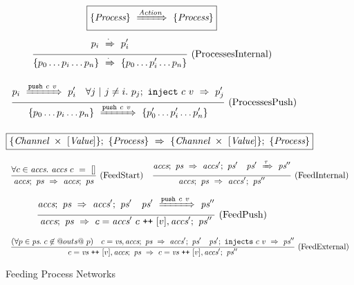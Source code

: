 
\begin{figure}

$$
  \boxed{\{ \textit{Process} \}~\xRightarrow{\textit{Action}}~\{ \textit{Process} \}}
$$
$$
\ruleIN{
  \ProcShake{p_i}{\cdot}{p'_i}
}{
  \ProcsShake{
    \sgl{p_0 \ldots p_i \ldots p_n}
  }{\cdot}{
    \sgl{p_0 \ldots p'_i \ldots p_n}
  }
}{ProcessesInternal}
$$

$$
\ruleIN{
  \ProcShake{p_i}{\Push~c~v}{p'_i}
  \quad
  \forall j~|~j \neq i.~
  \ProcInject{p_j}{c}{v}{p'_j}
}{
  \ProcsShake{
    \sgl{p_0 \ldots p_i \ldots p_n}
  }{\Push~c~v}{
    \sgl{p'_0 \ldots p'_i \ldots p'_n}
  }
}{ProcessesPush}
$$


\vspace{2em}
$$
  \boxed{
    \{\textit{Channel} ~\times~ [\textit{Value}]\};~\{ \textit{Process} \}~\Rightarrow~\{\textit{Channel} ~\times~ [\textit{Value}]\};~\{ \textit{Process} \}
  }
$$

\newcommand\vs {\ti{vs}}
\newcommand\accs {\ti{accs}}
\newcommand\network {\ti{ps}}

$$
\ruleIN{
  \forall c \in \accs.~
  \accs~c~=~[]
}{
  \ProcsFeed
    {\accs}
    {\network}
    {\accs}
    {\network}
}{FeedStart}
%
\ruleIN{
  \ProcsFeed
    {\accs}
    {\network}
    {\accs'}
    {\network'}
\quad
  \ProcsShake
    {\network'}
    {\tau}
    {\network''}
}{
  \ProcsFeed
    {\accs}
    {\network}
    {\accs'}
    {\network''}
}{FeedInternal}
$$

$$
\ruleIN{
  \ProcsFeed
    {\accs}
    {\network}
    {\accs'}
    {\network'}
\quad
  \ProcsShake
    {\network'}
    {\Push~c~v}
    {\network''}
}{
  \ProcsFeed
    {\accs}
    {\network}
    {c=\accs'~c \listappend [v], \accs'}
    {\network''}
}{FeedPush}
$$

$$
\ruleIN{
  (\forall p \in \network.~c \not\in @outs@~p)
\quad
  \ProcsFeed
    {c=\vs, \accs}
    {\network}
    {\accs'}
    {\network'}
\quad
  \ProcsInject
    {\network'}
    {c}{v}
    {\network''}
}{
  \ProcsFeed
    {c=\vs \listappend [v], \accs}
    {\network}
    {c=\vs \listappend [v], \accs'}
    {\network''}
}{FeedExternal}
$$



\caption{Feeding Process Networks}
\label{fig:Process:Eval:Feed}
\end{figure}

